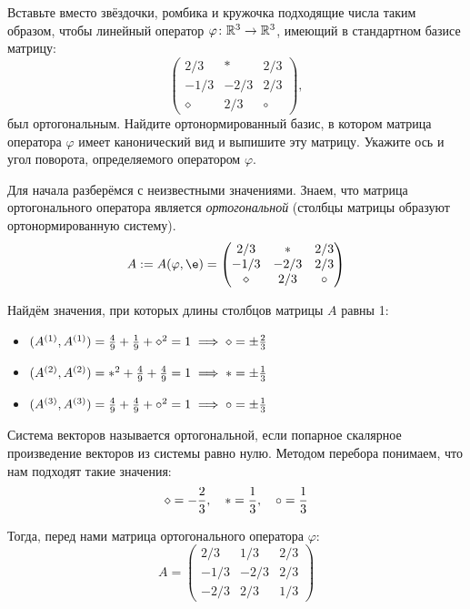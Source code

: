 \begin{condition}
    Вставьте вместо звёздочки, ромбика и кружочка подходящие числа таким образом, чтобы линейный оператор $\varphi \colon \mathbb{R}^3 \to \mathbb{R}^3$, имеющий в стандартном базисе матрицу:
    \[
        \begin{pmatrix}
            2/3      & *    & 2/3   \\
            -1/3     & -2/3 & 2/3   \\
            \diamond & 2/3  & \circ
        \end{pmatrix},
    \]
    был ортогональным. Найдите ортонормированный базис, в котором матрица оператора $\varphi$ имеет канонический вид и выпишите эту матрицу. Укажите ось и угол поворота, определяемого оператором $\varphi$.
\end{condition}

Для начала разберёмся с неизвестными значениями. Знаем, что матрица ортогонального оператора является \textit{ортогональной} (столбцы матрицы образуют ортонормированную систему).
\[
    A := A(\varphi, \e)
    =
    \begin{pmatrix}
        2/3      & *    & 2/3   \\
        -1/3     & -2/3 & 2/3   \\
        \diamond & 2/3  & \circ
    \end{pmatrix}
\]

Найдём значения, при которых длины столбцов матрицы $A$ равны 1:
\begin{itemize}
    \item $(A^{(1)}, A^{(1)}) = \frac{4}{9} + \frac{1}{9} + \diamond^2 = 1 \implies \diamond = \pm \frac{2}{3}$

    \item $(A^{(2)}, A^{(2)}) = *^2 + \frac{4}{9} + \frac{4}{9} = 1 \implies * = \pm \frac{1}{3}$

    \item $(A^{(3)}, A^{(3)}) = \frac{4}{9} + \frac{4}{9} + \circ^2 = 1 \implies \circ = \pm \frac{1}{3}$
\end{itemize}

Система векторов называется ортогональной, если попарное скалярное произведение векторов из системы равно нулю. Методом перебора понимаем, что нам подходят такие значения:
\[
    \diamond = -\frac{2}{3},
    \quad
    * = \frac{1}{3},
    \quad
    \circ = \frac{1}{3}
\]

Тогда, перед нами матрица ортогонального оператора $\varphi$:
\[
    A =
    \begin{pmatrix}
        2/3  & 1/3  & 2/3 \\
        -1/3 & -2/3 & 2/3 \\
        -2/3 & 2/3  & 1/3
    \end{pmatrix}
\]


